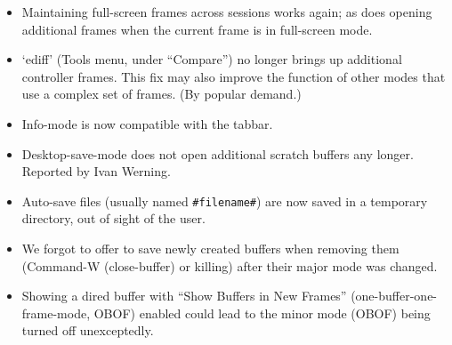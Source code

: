 \begin{itemize}
\item Maintaining full-screen frames across sessions works again; as does opening additional frames when the current frame is in full-screen mode.


\item `ediff' (Tools menu, under ``Compare'') no longer brings up additional controller frames.  This fix may also improve the function of other modes that use a complex set of frames. (By popular demand.)

\item Info-mode is now compatible with the tabbar.

\item Desktop-save-mode does not open additional scratch buffers any longer.
Reported by Ivan Werning.

\item Auto-save files (usually named {\tt \#filename\#}) are now saved in a temporary directory, out of sight of the user.

\item We forgot to offer to save newly created buffers when removing them (Command-W (close-buffer) or killing) after their major mode was changed.

\item Showing a dired buffer with ``Show Buffers in New Frames'' (one-buffer-one-frame-mode, OBOF) enabled could lead to  the minor mode (OBOF) being turned off unexceptedly.

\end{itemize}


